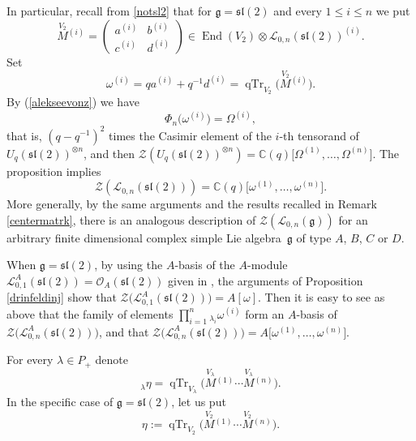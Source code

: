\documentclass[pdftex]{sigma}%
\numberwithin{equation}{section}
\numberwithin{figure}{section}
\newcommand{\mc}{\mathbb{C}}
\newcommand{\Ll}{{\mathcal L}}
\newcommand{\Oo}{{\mathcal O}}
\begin{document}
In particular, recall from \eqref{notsl2} that for $\mathfrak{g}={\mathfrak{sl}}(2)$ and every $1\leq i \leq n$ we put
\[
\stackrel{V_2}{M}{}^{\!\! (i)} =\begin{pmatrix} a^{(i)}&b^{(i)}\\c^{(i)}&d^{(i)}\end{pmatrix}\in \operatorname{End}(V_2)\otimes \Ll_{0,n}({\mathfrak{sl}}(2))^{(i)}.
\]
Set
\[
\omega^{(i)} = qa^{(i)} + q^{-1}d^{(i)} = \operatorname{qTr}_{V_2}\big(\!\stackrel{V_2}{M}{}^{\!\! (i)} \big).
\]
By (\ref{alekseevonz}) we have \[\Phi_n\big(\omega^{(i)}\big)=\Omega^{(i)},\] that is, $(q-q^{-1})^2$ times the Casimir element of the $i$-th tensorand of $U_q({\mathfrak{sl}}(2))^{\otimes n}$, and then $\mathcal{Z}(U_q({\mathfrak{sl}}(2))^{\otimes n}) = \mc(q)\big[\Omega^{(1)},\dots,\Omega^{(n)}\big]$. The proposition implies
\begin{equation*}%
\mathcal{Z}(\Ll_{0,n}({\mathfrak{sl}}(2))) = \mc(q)\big[\omega^{(1)},\dots,\omega^{(n)}\big].
\end{equation*}
More generally, by the same arguments and the results recalled in Remark \ref{centermatrk}, there is an ana\-lo\-gous description of $\mathcal{Z}(\Ll_{0,n}(\mathfrak{g}))$ for an arbitrary finite dimensional complex simple Lie algebra~$\mathfrak{g}$ of type $A$, $B$, $C$ or $D$.

\begin{remk}\label{centersl2A}{\rm When $\mathfrak{g}={\mathfrak{sl}}(2)$, by using the $A$-basis of the $A$-module $\Ll_{0,1}^A({\mathfrak{sl}}(2))=\Oo_A({\mathfrak{sl}}(2))$ given in \cite[Proposition~1.3]{DC-L}, the arguments of Proposition \ref{drinfeldinj} show that $\mathcal{Z}\big(\Ll_{0,1}^A({\mathfrak{sl}}(2))\big)=A[\omega]$. Then it is easy to see as above that the family of elements $\textstyle \prod_{i=1}^n {}_{\lambda_i}\omega^{(i)}$ form an $A$-basis of $\mathcal{Z}\big(\Ll_{0,n}^A({\mathfrak{sl}}(2))\big)$, and that $\mathcal{Z}\big(\Ll_{0,n}^A({\mathfrak{sl}}(2))\big) = A\big[\omega^{(1)},\dots,\omega^{(n)}\big]$.}
\end{remk}

For every $\lambda\in P_+$ denote
\[
{}_\lambda\eta= \operatorname{qTr}_{V_\lambda}\big(\!\stackrel{V_\lambda}{M}{}^{\!\! (1)}\cdots \stackrel{V_\lambda}{M}{}^{\!\! (n)}\big).
\]
In the specific case of $\mathfrak{g}={\mathfrak{sl}}(2)$, let us put
\begin{equation}\label{eta}
\eta:=\operatorname{qTr}_{V_2}\big(\!\stackrel{V_2}{M}{}^{\!\! (1)}\cdots \stackrel{V_2}{M}{}^{\!\! (n)}\big).
\end{equation}
\end{document}
